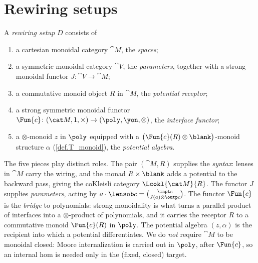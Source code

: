 \section{Rewiring setups}\label{sec.rewiring_setup}

\begin{definition}\label{def.rewiring_setup}
A \emph{rewiring setup} $D$ consists of
\begin{enumerate}
  \item a cartesian monoidal category $\cat M$, the \emph{spaces};
  \item a symmetric monoidal category $\cat V$, the \emph{parameters}, together
    with a strong monoidal functor $J\colon\cat V\to\cat M$;
  \item a commutative monoid object $R$ in $\cat M$, the \emph{potential receptor};
  \item a strong symmetric monoidal functor
    $\Fun{c}\colon(\cat M,1,\times)\to(\poly,\yon,\otimes)$, the \emph{interface functor};
  \item a $\otimes$-monoid $z$ in $\poly$ equipped with a
    $\bigl(\Fun{c}(R)\otimes\blank\bigr)$-monoid structure $\alpha$
    (\cref{def.T_monoid}), the \emph{potential algebra}.
\end{enumerate}
\end{definition}

The five pieces play distinct roles. The pair $(\cat M,R)$ supplies the
\emph{syntax}: lenses in $\cat M$ carry the wiring, and the monad $R\times\blank$
adds a potential to the backward pass, giving the coKleisli category
$\Lcokl{\cat M}{R}$. The functor $J$ supplies \emph{parameters}, acting by
$a\cdot\lensob c=\binom{\inpt c}{J(a)\otimes\outp c}$. The functor $\Fun{c}$ is the
\emph{bridge} to polynomials: strong monoidality is what turns a parallel product
of interfaces into a $\otimes$-product of polynomials, and it carries the receptor
$R$ to a commutative monoid $\Fun{c}(R)$ in $\poly$. The potential algebra
$(z,\alpha)$ is the recipient into which a potential differentiates. We do
\emph{not} require $\cat M$ to be monoidal closed: Moore internalization is carried
out in $\poly$, after $\Fun{c}$, so an internal hom is needed only in the (fixed,
closed) target.

